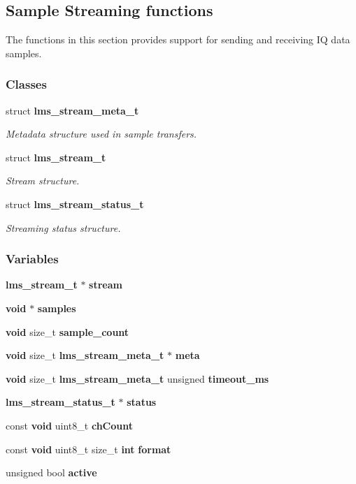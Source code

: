 \subsection{Sample Streaming functions}
\label{group__FN__STREAM}


The functions in this section provides support for sending and receiving IQ data samples.  


\subsubsection*{Classes}
\begin{DoxyCompactItemize}
\item 
struct {\bf lms\+\_\+stream\+\_\+meta\+\_\+t}
\begin{DoxyCompactList}\small\item\em Metadata structure used in sample transfers. \end{DoxyCompactList}\item 
struct {\bf lms\+\_\+stream\+\_\+t}
\begin{DoxyCompactList}\small\item\em Stream structure. \end{DoxyCompactList}\item 
struct {\bf lms\+\_\+stream\+\_\+status\+\_\+t}
\begin{DoxyCompactList}\small\item\em Streaming status structure. \end{DoxyCompactList}\end{DoxyCompactItemize}
\subsubsection*{Variables}
\begin{DoxyCompactItemize}
\item 
{\bf lms\+\_\+stream\+\_\+t} $\ast$ {\bf stream}
\item 
{\bf void} $\ast$ {\bf samples}
\item 
{\bf void} size\+\_\+t {\bf sample\+\_\+count}
\item 
{\bf void} size\+\_\+t {\bf lms\+\_\+stream\+\_\+meta\+\_\+t} $\ast$ {\bf meta}
\item 
{\bf void} size\+\_\+t {\bf lms\+\_\+stream\+\_\+meta\+\_\+t} unsigned {\bf timeout\+\_\+ms}
\item 
{\bf lms\+\_\+stream\+\_\+status\+\_\+t} $\ast$ {\bf status}
\item 
const {\bf void} uint8\+\_\+t {\bf ch\+Count}
\item 
const {\bf void} uint8\+\_\+t size\+\_\+t {\bf int} {\bf format}
\item 
unsigned bool {\bf active}
\end{DoxyCompactItemize}


